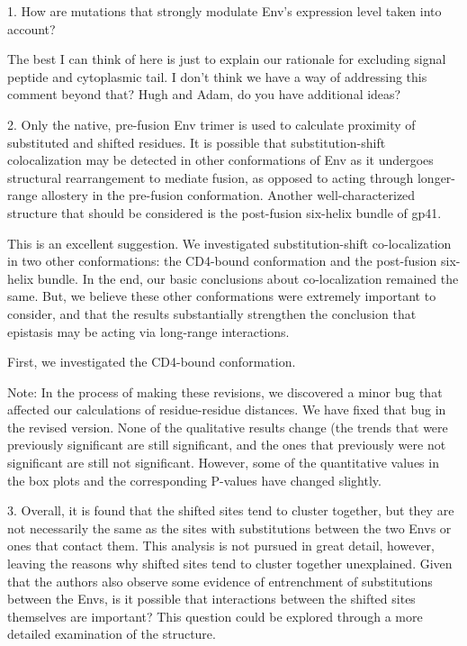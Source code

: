 \documentclass[11pt, oneside]{article}   	%
\begin{document}
1. How are mutations that strongly modulate Env's expression level taken into account? 

{\color{red}
The best I can think of here is just to explain our rationale for excluding signal peptide and cytoplasmic tail. 
I don't think we have a way of addressing this comment beyond that?
Hugh and Adam, do you have additional ideas?
}

2. Only the native, pre-fusion Env trimer is used to calculate proximity of substituted and shifted residues. It is possible that substitution-shift colocalization may be detected in other conformations of Env as it undergoes structural rearrangement to mediate fusion, as opposed to acting through longer-range allostery in the pre-fusion conformation. Another well-characterized structure that should be considered is the post-fusion six-helix bundle of gp41. 

{\color{red}
This is an excellent suggestion. We investigated substitution-shift co-localization in two other conformations: the CD4-bound conformation and the post-fusion six-helix bundle. In the end, our basic conclusions about co-localization remained the same. But, we believe these other conformations were extremely important to consider, and that the results substantially strengthen the conclusion that epistasis may be acting via long-range interactions.

First, we investigated the CD4-bound conformation.

Note: In the process of making these revisions, we discovered a minor bug that affected our calculations of residue-residue distances. We have fixed that bug in the revised version. None of the qualitative results change (the trends that were previously significant are still significant, and the ones that previously were not significant are still not significant. However, some of the quantitative values in the box plots and the corresponding P-values have changed slightly.
}

3. Overall, it is found that the shifted sites tend to cluster together, but they are not necessarily the same as the sites with substitutions between the two Envs or ones that contact them. This analysis is not pursued in great detail, however, leaving the reasons why shifted sites tend to cluster together unexplained. Given that the authors also observe some evidence of entrenchment of substitutions between the Envs, is it possible that interactions between the shifted sites themselves are important? This question could be explored through a more detailed examination of the structure. 
\end{document}
